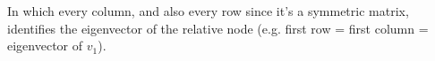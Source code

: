 \documentclass{article}
\begin{document}
\begin{enumerate}[a)]
    \noindent In which every column, and also every row since it's a symmetric matrix, identifies the eigenvector of the relative node (e.g. first row = first column = eigenvector of \(v_{1}\)).
    
    \end{enumerate}
\end{document}
